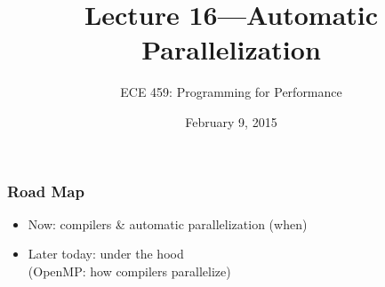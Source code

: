\documentclass[aspectratio=43]{beamer}
\title{Lecture 16---Automatic Parallelization}
\subtitle{ECE 459: Programming for Performance}
\date{February 9, 2015}
\newenvironment{changemargin}[1]{%
  \begin{list}{}{%
    \setlength{\topsep}{0pt}%
    \setlength{\leftmargin}{#1}%
    \setlength{\rightmargin}{1em}
    \setlength{\listparindent}{\parindent}%
    \setlength{\itemindent}{\parindent}%
    \setlength{\parsep}{\parskip}%
  }%
  \item[]}{\end{list}}
\begin{document}
\begin{frame}[plain]
  \titlepage
\end{frame}

\begin{frame}
  \frametitle{Road Map}

  \begin{changemargin}{1cm}
    \begin{itemize}
    \item Now: compilers \& automatic parallelization (when)
    \item Later today: under the hood\\
      \hspace*{2cm}(OpenMP: how compilers parallelize)
    \end{itemize}
  \end{changemargin}
\end{frame}
\end{document}
